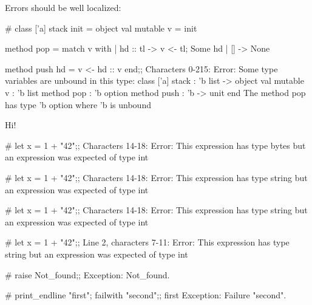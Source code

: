 Errors should be well localized:

\begin{ocaml}
# class ['a] stack init = object
    val mutable v = init

    method pop =
      match v with
      | hd :: tl ->
        v <- tl;
        Some hd
      | [] -> None

    method push hd =
      v <- hd :: v
  end;;
Characters 0-215:
Error: Some type variables are unbound in this type:
         class ['a] stack :
           'b list ->
           object
             val mutable v : 'b list
             method pop : 'b option
             method push : 'b -> unit
           end
       The method pop has type 'b option where 'b is unbound
\end{ocaml}

Hi!


\begin{ocaml}
# let x =
  1 + "42";;
Characters 14-18:
Error: This expression has type bytes but an expression was expected of type
         int
\end{ocaml}

\begin{ocaml}
# let x =
  1 + "42";;
Characters 14-18:
Error: This expression has type string but an expression was expected of type
         int
\end{ocaml}

\begin{ocaml}
# let x =
  1 + "42";;
Characters 14-18:
Error: This expression has type string but an expression was expected of type
         int
\end{ocaml}

\begin{ocaml}
# let x =
  1 + "42";;
Line 2, characters 7-11:
Error: This expression has type string but an expression was expected of type
         int
\end{ocaml}

\begin{ocaml}
# raise Not_found;;
Exception: Not_found.
\end{ocaml}

\begin{ocaml}
# print_endline "first"; failwith "second";;
first
Exception: Failure "second".
\end{ocaml}

